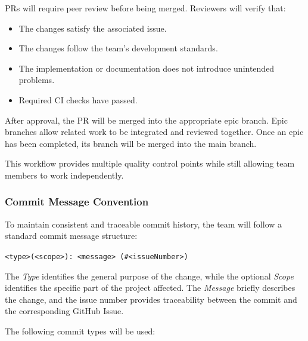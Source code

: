 \documentclass{article}
\begin{document}
PRs will require peer review before being merged. Reviewers will verify that:

\begin{itemize}
    \item The changes satisfy the associated issue.
    \item The changes follow the team's development standards.
    \item The implementation or documentation does not introduce unintended
    problems.
    \item Required CI checks have passed.
\end{itemize}

After approval, the PR will be merged into the appropriate epic branch.
Epic branches allow related work to be integrated and reviewed together.
Once an epic has been completed, its branch will be merged into the main
branch.

This workflow provides multiple quality control points while still allowing
team members to work independently.

\subsubsection{Commit Message Convention}

To maintain consistent and traceable commit history, the team will follow a
standard commit message structure:

\begin{center}
    \texttt{<type>(<scope>): <message> (\#<issueNumber>)}
\end{center}

The \textit{Type} identifies the general purpose of the change, while the
optional \textit{Scope} identifies the specific part of the project affected.
The \textit{Message} briefly describes the change, and the issue number
provides traceability between the commit and the corresponding GitHub Issue.

The following commit types will be used:
\end{document}
